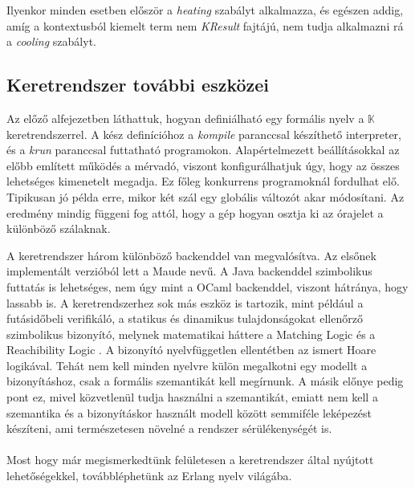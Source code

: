 

Ilyenkor minden esetben először a \textit{heating} szabályt alkalmazza, és egészen addig, amíg a kontextusból kiemelt term nem \textit{KResult} fajtájú, nem tudja alkalmazni rá a \textit{cooling} szabályt.

\subsection{Keretrendszer további eszközei}

Az előző alfejezetben láthattuk, hogyan definiálható egy formális nyelv a $\mathbb{K}$ keretrendszerrel. A kész definícióhoz a \textit{kompile} paranccsal készíthető interpreter, és a \textit{krun} paranccsal futtatható programokon. Alapértelmezett beállításokkal az előbb említett működés a mérvadó, viszont konfigurálhatjuk úgy, hogy az összes lehetséges kimenetelt megadja. Ez főleg konkurrens programoknál fordulhat elő. Tipikusan jó példa erre, mikor két szál egy globális változót akar módosítani. Az eredmény mindig függeni fog attól, hogy a gép hogyan osztja ki az órajelet a különböző szálaknak.

A keretrendszer három különböző backenddel van megvalósítva. Az elsőnek implementált verzióból lett a Maude nevű. A Java backenddel szimbolikus futtatás is lehetséges, nem úgy mint a OCaml backenddel, viszont hátránya, hogy lassabb is. A keretrendszerhez sok más eszköz is tartozik, mint például a futásidőbeli verifikáló, a statikus és dinamikus tulajdonságokat ellenőrző szimbolikus bizonyító, melynek matematikai háttere a Matching Logic \cite{MatchLog} és a Reachibility Logic \cite{ReachLog}. A bizonyító nyelvfüggetlen ellentétben az ismert Hoare logikával. Tehát nem kell minden nyelvre külön megalkotni egy modellt a bizonyításhoz, csak a formális szemantikát kell megírnunk. A másik előnye pedig pont ez, mivel közvetlenül tudja használni a szemantikát, emiatt nem kell a szemantika és a bizonyításkor használt modell között semmiféle leképezést készíteni, ami természetesen növelné a rendszer sérülékenységét is.

\paragraph{}
Most hogy már megismerkedtünk felületesen a keretrendszer által nyújtott lehetőségekkel, továbbléphetünk az Erlang nyelv világába.

